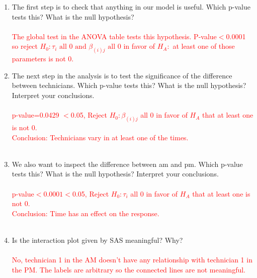 \begin{enumerate}
\item The first step is to check that anything in our model is useful.  Which p-value tests this? What is the null hypothesis?\\~\\%
\textcolor{red}{The global test in the ANOVA table tests this hypothesis.  P-value$<$0.0001 so reject $H_0:\tau_i\mbox{ all 0 and }\beta_{(i)j} \mbox{ all 0}$ in favor of $H_A:$ at least one of those parameters is not 0.}
\newpage

\item The next step in the analysis is to test the significance of the difference between technicians.  Which p-value tests this?  What is the null hypothesis?  Interpret your conclusions.\\~\\%
\textcolor{red}{p-value=0.0429 $<$0.05, Reject $H_0: \beta_{(i)j}$ all 0 in favor of $H_A$ that at least one is not 0.  \\
Conclusion: Technicians vary in at least one of the times.}\\~\\

\item We also want to inspect the difference between am and pm.  Which p-value tests this?  What is the null hypothesis?  Interpret your conclusions.\\~\\%
\textcolor{red}{p-value$<0.0001<$0.05, Reject $H_0: \tau_{i}$ all 0 in favor of $H_A$ that at least one is not 0.  \\
Conclusion: Time has an effect on the response.}\\~\\

\item Is the interaction plot given by SAS meaningful?  Why?\\~\\%
\textcolor{red}{No, technician 1 in the AM doesn't have any relationship with technician 1 in the PM.  The labels are arbitrary so the connected lines are not meaningful.}\\~\\


\end{enumerate}
